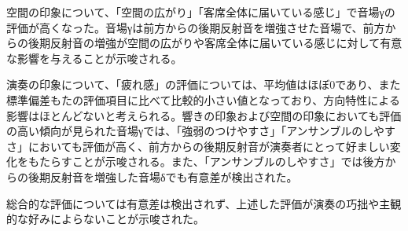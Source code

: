 \documentclass[11pt,a4j]{jreport}
\begin{document}
空間の印象について、「空間の広がり」「客席全体に届いている感じ」で音場γの評価が高くなった。音場γは前方からの後期反射音を増強させた音場で、前方からの後期反射音の増強が空間の広がりや客席全体に届いている感じに対して有意な影響を与えることが示唆される。
  
演奏の印象について、「疲れ感」の評価については、平均値はほぼ0であり、また標準偏差もたの評価項目に比べて比較的小さい値となっており、方向特性による影響はほとんどないと考えられる。響きの印象および空間の印象においても評価の高い傾向が見られた音場γでは、「強弱のつけやすさ」「アンサンブルのしやすさ」においても評価が高く、前方からの後期反射音が演奏者にとって好ましい変化をもたらすことが示唆される。また、「アンサンブルのしやすさ」では後方からの後期反射音を増強した音場δでも有意差が検出された。

総合的な評価については有意差は検出されず、上述した評価が演奏の巧拙や主観的な好みによらないことが示唆された。
  
\end{document}
